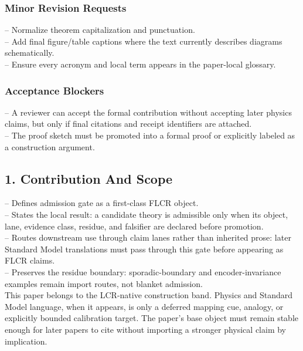 \documentclass[11pt]{article}
\begin{document}
\subsubsection*{Minor Revision Requests}

\noindent{}-- Normalize theorem capitalization and punctuation.\\
\noindent{}-- Add final figure/table captions where the text currently describes diagrams schematically.\\
\noindent{}-- Ensure every acronym and local term appears in the paper-local glossary.\\

\subsubsection*{Acceptance Blockers}

\noindent{}-- A reviewer can accept the formal contribution without accepting later physics claims, but only if final citations and receipt identifiers are attached.\\
\noindent{}-- The proof sketch must be promoted into a formal proof or explicitly labeled as a construction argument.\\


\subsection*{1. Contribution And Scope}

\noindent{}-- Defines admission gate as a first-class FLCR object.\\
\noindent{}-- States the local result: a candidate theory is admissible only when its object, lane, evidence class, residue, and falsifier are declared before promotion.\\
\noindent{}-- Routes downstream use through claim lanes rather than inherited prose: later Standard Model translations must pass through this gate before appearing as FLCR claims.\\
\noindent{}-- Preserves the residue boundary: sporadic-boundary and encoder-invariance examples remain import routes, not blanket admission.\\

This paper belongs to the LCR-native construction band. Physics and Standard Model language, when it appears, is only a deferred mapping cue, analogy, or explicitly bounded calibration target. The paper's base object must remain stable enough for later papers to cite without importing a stronger physical claim by implication.
\end{document}
